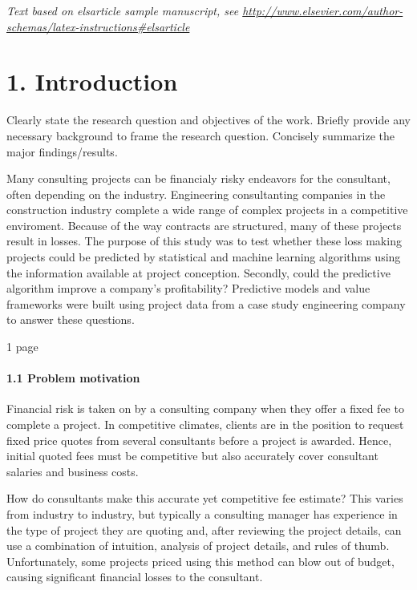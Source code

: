 \documentclass[]{elsarticle} %
\begin{document}
\emph{Text based on elsarticle sample manuscript, see
\url{http://www.elsevier.com/author-schemas/latex-instructions\#elsarticle}}

\section{1. Introduction}\label{introduction}

Clearly state the research question and objectives of the work. Briefly
provide any necessary background to frame the research question.
Concisely summarize the major findings/results.

Many consulting projects can be financialy risky endeavors for the
consultant, often depending on the industry. Engineering consultanting
companies in the construction industry complete a wide range of complex
projects in a competitive enviroment. Because of the way contracts are
structured, many of these projects result in losses. The purpose of this
study was to test whether these loss making projects could be predicted
by statistical and machine learning algorithms using the information
available at project conception. Secondly, could the predictive
algorithm improve a company's profitability? Predictive models and value
frameworks were built using project data from a case study engineering
company to answer these questions.

1 page

\paragraph{1.1 Problem motivation}\label{problem-motivation}

Financial risk is taken on by a consulting company when they offer a
fixed fee to complete a project. In competitive climates, clients are in
the position to request fixed price quotes from several consultants
before a project is awarded. Hence, initial quoted fees must be
competitive but also accurately cover consultant salaries and business
costs.

How do consultants make this accurate yet competitive fee estimate? This
varies from industry to industry, but typically a consulting manager has
experience in the type of project they are quoting and, after reviewing
the project details, can use a combination of intuition, analysis of
project details, and rules of thumb. Unfortunately, some projects priced
using this method can blow out of budget, causing significant financial
losses to the consultant.
\end{document}
